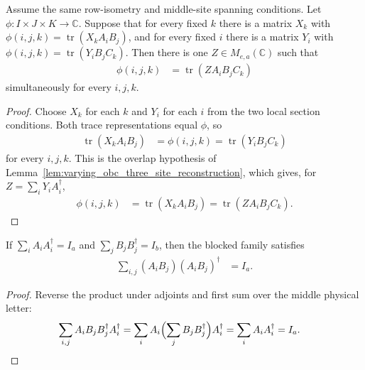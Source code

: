 \begin{lemma}
    \label{lem:varying_obc_pair_sections_reconstruct}
    \leanok
    Assume the same row-isometry and middle-site spanning conditions.
    Let $\phi:I\times J\times K\to\mathbb C$. Suppose that for every
    fixed $k$ there is a matrix $X_k$ with
    $\phi(i,j,k)=\operatorname{tr}(X_kA_iB_j)$, and for every fixed $i$
    there is a matrix $Y_i$ with
    $\phi(i,j,k)=\operatorname{tr}(Y_iB_jC_k)$. Then there is one
    $Z\in M_{e,a}(\mathbb C)$ such that
    \begin{align}
        \phi(i,j,k) & =\operatorname{tr}(ZA_iB_jC_k)
    \end{align}
    simultaneously for every $i,j,k$.
\end{lemma}
\begin{proof}\leanok
    Choose $X_k$ for each $k$ and $Y_i$ for each $i$ from the two local
    section conditions. Both trace representations equal $\phi$, so
    \begin{align}
        \operatorname{tr}(X_kA_iB_j) & =\phi(i,j,k)
        =\operatorname{tr}(Y_iB_jC_k)
    \end{align}
    for every $i,j,k$. This is the overlap hypothesis of
    Lemma~\ref{lem:varying_obc_three_site_reconstruction}, which gives, for
    $Z=\sum_iY_iA_i^\dagger$,
    \begin{align}
        \phi(i,j,k) & =\operatorname{tr}(X_kA_iB_j)
        =\operatorname{tr}(ZA_iB_jC_k).
    \end{align}
\end{proof}

\begin{lemma}
    \label{lem:varying_obc_block_row_isometry}
    \leanok
    If $\sum_iA_iA_i^\dagger=I_a$ and $\sum_jB_jB_j^\dagger=I_b$, then the
    blocked family satisfies
    \begin{align}
        \sum_{i,j}(A_iB_j)(A_iB_j)^\dagger & =I_a.
    \end{align}
\end{lemma}
\begin{proof}\leanok
    Reverse the product under adjoints and first sum over the middle
    physical letter:
    \begin{align}
        \sum_{i,j}A_iB_jB_j^\dagger A_i^\dagger
         & =\sum_iA_i\Bigl(\sum_jB_jB_j^\dagger\Bigr)A_i^\dagger
        =\sum_iA_iA_i^\dagger=I_a.
    \end{align}
\end{proof}


